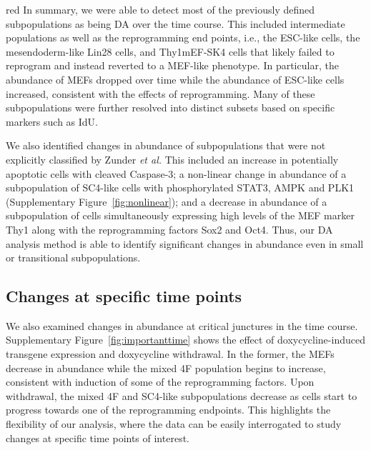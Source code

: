 \documentclass{article}
\begin{document}
\begin{color}{red}
In summary, we were able to detect most of the previously defined subpopulations as being DA over the time course.
This included intermediate populations as well as the reprogramming end points, i.e., the ESC-like cells, the mesendoderm-like Lin28\hi{} cells, and Thy1\hi{}mEF-SK4\hi{} cells that likely failed to reprogram and instead reverted to a MEF-like phenotype.
In particular, the abundance of MEFs dropped over time while the abundance of ESC-like cells increased, consistent with the effects of reprogramming.
Many of these subpopulations were further resolved into distinct subsets based on specific markers such as IdU.

We also identified changes in abundance of subpopulations that were not explicitly classified by Zunder \emph{et al.}
This included an increase in potentially apoptotic cells with cleaved Caspase-3;
a non-linear change in abundance of a subpopulation of SC4-like cells with phosphorylated STAT3, AMPK and PLK1 (Supplementary Figure~\ref{fig:nonlinear});
and a decrease in abundance of a subpopulation of cells simultaneously expressing high levels of the MEF marker Thy1 along with the reprogramming factors Sox2 and Oct4.
Thus, our DA analysis method is able to identify significant changes in abundance even in small or transitional subpopulations.

\subsection{Changes at specific time points}
We also examined changes in abundance at critical junctures in the time course.
Supplementary Figure~\ref{fig:importanttime} shows the effect of doxycycline-induced transgene expression and doxycycline withdrawal.
In the former, the MEFs decrease in abundance while the mixed 4F population begins to increase, consistent with induction of some of the reprogramming factors.
Upon withdrawal, the mixed 4F and SC4-like subpopulations decrease as cells start to progress towards one of the reprogramming endpoints.
This highlights the flexibility of our analysis, where the data can be easily interrogated to study changes at specific time points of interest.


\end{color}
\end{document}
